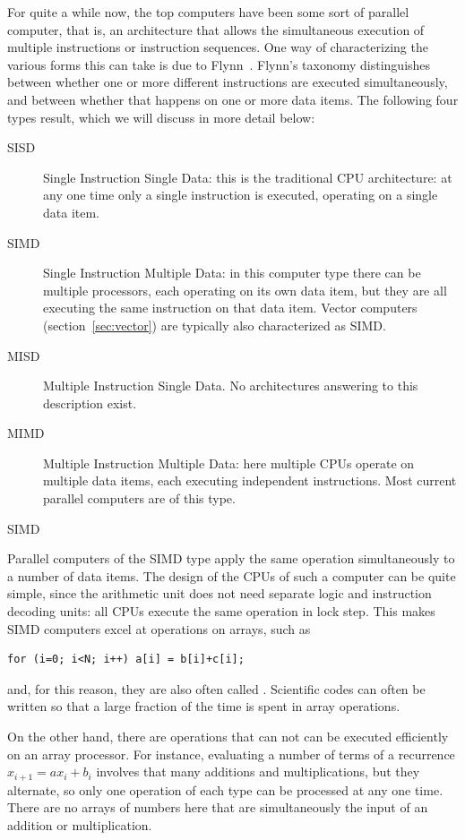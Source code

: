For quite a while now, the top computers have been
some sort of parallel computer, that is, an architecture that allows
the simultaneous execution of multiple instructions or instruction
sequences. One way of characterizing the various forms this can take
is due to Flynn~\cite{flynn:taxonomy}. Flynn's taxonomy distinguishes
between whether one or more different instructions are executed
simultaneously, and between whether that happens on one or more data
items. The following four types result, which we will discuss in more
detail below:
\begin{description}
\item[SISD] Single Instruction Single Data: this is the traditional
  CPU architecture: at any one time only a single instruction is
  executed, operating on a single data item.
\item[SIMD] Single Instruction Multiple Data: in this computer type
  there can be multiple processors, each operating on its own data
  item, but they are all executing the same instruction on that data
  item. Vector computers (section~\ref{sec:vector}) are typically also
  characterized as SIMD.
\item[MISD] Multiple Instruction Single Data. No architectures
  answering to this description exist.
\item[MIMD] Multiple Instruction Multiple Data: here multiple CPUs
  operate on multiple data items, each executing independent
  instructions. Most current parallel computers are of this
  type.
\end{description}


 {SIMD}
\label{sec:simd}

Parallel computers of the SIMD type apply the same operation
simultaneously to a number of data items. The design of the CPUs of
such a computer can be quite simple, since the arithmetic unit does
not need separate logic and instruction decoding units: all CPUs
execute the same operation in lock step. 
This makes SIMD computers excel at operations on arrays, such as
%
\begin{verbatim}
for (i=0; i<N; i++) a[i] = b[i]+c[i];
\end{verbatim}
and, for this reason, they are also often called . Scientific codes can often be written so that
a large fraction of the time is spent in array operations.

On the other hand, there are operations that can not can be executed
efficiently on an array processor. For instance, evaluating a number
of terms of a recurrence $x_{i+1}=ax_i+b_i$ involves that many
additions and multiplications, but they alternate, so only one
operation of each type can be processed at any one time. There are no
arrays of numbers here that are simultaneously the input of an
addition or multiplication.

